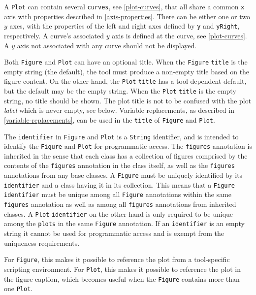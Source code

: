 A \lstinline!Plot! can contain several \lstinline!curves!, see \cref{plot-curves}, that all share a common \lstinline!x! axis with properties described in \cref{axis-properties}.
There can be either one or two $y$ axes, with the properties of the left and right axes defined by \lstinline!y! and \lstinline!yRight!, respectively.
A curve's associated $y$ axis is defined at the curve, see \cref{plot-curves}.
A $y$ axis not associated with any curve should not be displayed.

Both \lstinline!Figure! and \lstinline!Plot! can have an optional title.
When the \lstinline!Figure! \lstinline!title! is the empty string (the default), the tool must produce a non-empty title based on the figure content.
On the other hand, the \lstinline!Plot! \lstinline!title! has a tool-dependent default, but the default may be the empty string.
When the \lstinline!Plot! \lstinline!title! is the empty string, no title should be shown.
The plot title is not to be confused with the plot \emph{label} which is never empty, see below.
Variable replacements, as described in \cref{variable-replacements}, can be used in the \lstinline!title! of \lstinline!Figure! and \lstinline!Plot!.

The \lstinline!identifier! in \lstinline!Figure! and \lstinline!Plot! is a \lstinline!String! identifier, and is intended to identify the \lstinline!Figure! and \lstinline!Plot! for programmatic access.
The \lstinline!figures! annotation is inherited in the sense that each class has a collection of figures comprised by the contents of the \lstinline!figures! annotation in the class itself, as well as the \lstinline!figures! annotations from any base classes.
A \lstinline!Figure! must be uniquely identified by its \lstinline!identifier! and a class having it in its collection.
This means that a \lstinline!Figure! \lstinline!identifier! must be unique among all \lstinline!Figure! annotations within the same \lstinline!figures! annotation as well as among all \lstinline!figures! annotations from inherited classes.
A \lstinline!Plot! \lstinline!identifier! on the other hand is only required to be unique among the \lstinline!plots! in the same \lstinline!Figure! annotation.
If an \lstinline!identifier! is an empty string it cannot be used for programmatic access and is exempt from the uniqueness requirements.

\begin{nonnormative}
For \lstinline!Figure!, this makes it possible to reference the plot from a tool-specific scripting environment.
For \lstinline!Plot!, this makes it possible to reference the plot in the figure caption, which becomes useful when the \lstinline!Figure! contains more than one \lstinline!Plot!.
\end{nonnormative}

